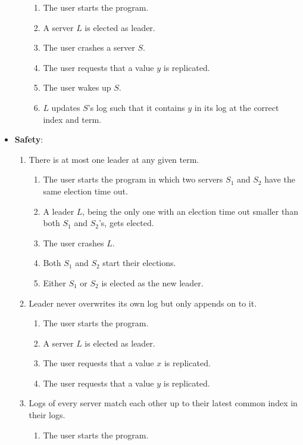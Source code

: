 \begin{itemize}
\begin{enumerate}
\begin{enumerate}
        \item The user starts the program.
        \item A server $L$ is elected as leader.
        \item The user crashes a server $S$.
        \item The user requests that a value $y$ is replicated.
        \item The user wakes up $S$.
        \item $L$ updates $S$'s log such that it contains $y$ in its log at the correct index and term.
        \end{enumerate}
    \end{enumerate}
\item \textbf{Safety}:
    \begin{enumerate}
    \item There is at most one leader at any given term.
        \begin{enumerate}
        \item The user starts the program in which two servers $S_1$ and $S_2$ have the same election time out.
        \item A leader $L$, being the only one with an election time out smaller than both $S_1$ and $S_2$'s, gets elected.
        \item The user crashes $L$.
        \item Both $S_1$ and $S_2$ start their elections.
        \item Either $S_1$ or $S_2$ is elected as the new leader.
        \end{enumerate}
    \item Leader never overwrites its own log but only appends on to it.
        \begin{enumerate}
        \item The user starts the program.
        \item A server $L$ is elected as leader.
        \item The user requests that a value $x$ is replicated.
        \item The user requests that a value $y$ is replicated.%
        \end{enumerate}
    \item Logs of every server match each other up to their latest common index in their logs.
        \begin{enumerate}
        \item The user starts the program.

\end{enumerate}
\end{enumerate}
\end{itemize}
